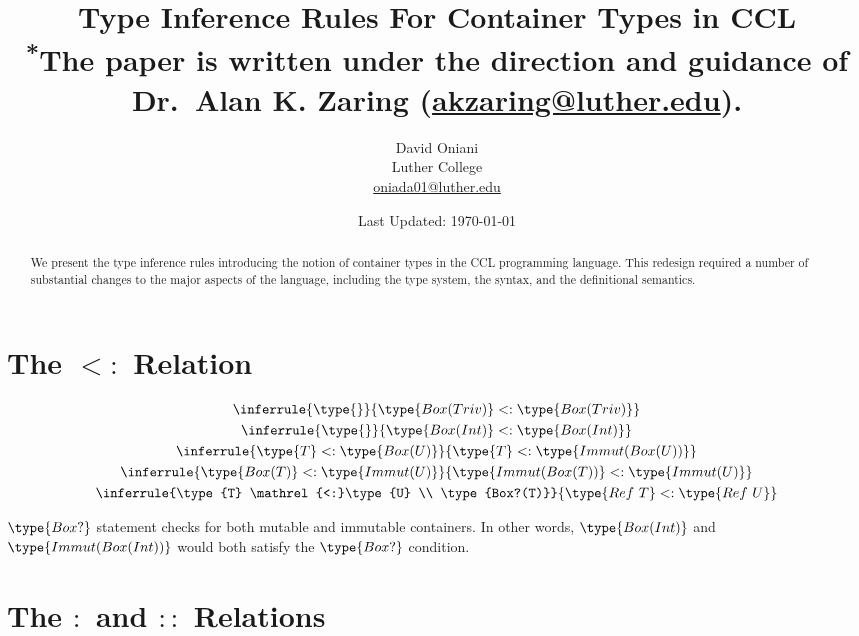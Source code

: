 \documentclass{article}
\author{David Oniani\\
        Luther College\\
        \href{mailto:oniada01@luther.edu}{oniada01@luther.edu}}
\title{\textbf{Type Inference Rules For Container Types in CCL}\\
       \medskip
       \small \textsuperscript{*}The paper is written under the direction and
       guidance of Dr.\ Alan K. Zaring
       (\href{mailto:akzaring@luther.edu}{akzaring@luther.edu}).}
\date{Last Updated: \today}
\newcommand\rtypeof{\mathrel{:}}
\newcommand\ltypeof{\mathrel{::}}
\newcommand\subtype{\mathrel{<:}}
\begin{document}
\maketitle


\begin{abstract}
\noindent We present the type inference rules introducing the notion of
container types in the CCL programming language. This redesign required a
number of substantial changes to the major aspects of the language, including
the type system, the syntax, and the definitional semantics.
\end{abstract}


\section*{The $\subtype$ Relation}

\begin{gather}
  \inferrule{\type{}}{\type{Box(Triv)} \subtype \type{Box(Triv)}}\\
  \inferrule{\type{}}{\type{Box(Int)} \subtype \type{Box(Int)}}\\
  \inferrule{\type{T} \subtype \type{Box(U)}}{\type{T} \subtype \type{Immut(Box(U))}}\\
  \inferrule{\type{Box(T)} \subtype \type{Immut(U)}}{\type{Immut(Box(T))} \subtype \type{Immut(U)}}\\
  \inferrule{\type{T} \subtype \type{U} \\ \type{Box?(T)}}{\type{Ref\ T} \subtype \type{Ref\ U}}
\end{gather}

$\type{Box?}$ statement checks for both mutable and immutable containers.
In other words, $\type{Box(Int)}$ and $\type{Immut(Box(Int))}$ would both
satisfy the $\type{Box?}$ condition.


\section*{The $\rtypeof$ and $\ltypeof$ Relations}
\end{document}
